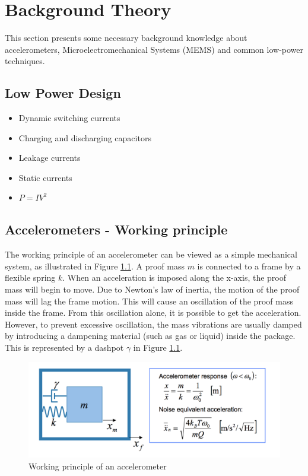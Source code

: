 \chapter{Background Theory}

This section presents some necessary background knowledge about accelerometers, Microelectromechanical Systems (MEMS) and common low-power techniques.  

\section{Low Power Design}

\begin{itemize}
  \item Dynamic switching currents
  \item Charging and discharging capacitors
  \item Leakage currents
  \item Static currents
  \item $P=IV^2$
\end{itemize}

\section{Accelerometers - Working principle} \label{sec:accel_working_principle}

The working principle of an accelerometer can be viewed as a simple mechanical system, as illustrated in Figure \ref{fig:accel_working_principle}. A proof mass $m$ is connected to a frame by a flexible spring $k$. When an acceleration is imposed along the x-axis, the proof mass will begin to move. Due to Newton's law of inertia, the motion of the proof mass will lag the frame motion. This will cause an oscillation of the proof mass inside the frame. From this oscillation alone, it is possible to get the acceleration. However, to prevent excessive oscillation, the mass vibrations are usually damped by introducing a dampening material (such as gas or liquid) inside the package. This is represented by a dashpot $\gamma$ in Figure \ref{fig:accel_working_principle}.

\begin{figure}[h]
\centering
\includegraphics[scale=0.5]{fig/accelerometer_working_principle.png}
\caption{Working principle of an accelerometer \cite[~p.34]{kaajakari09}}
\label{fig:accel_working_principle}
\end{figure}

